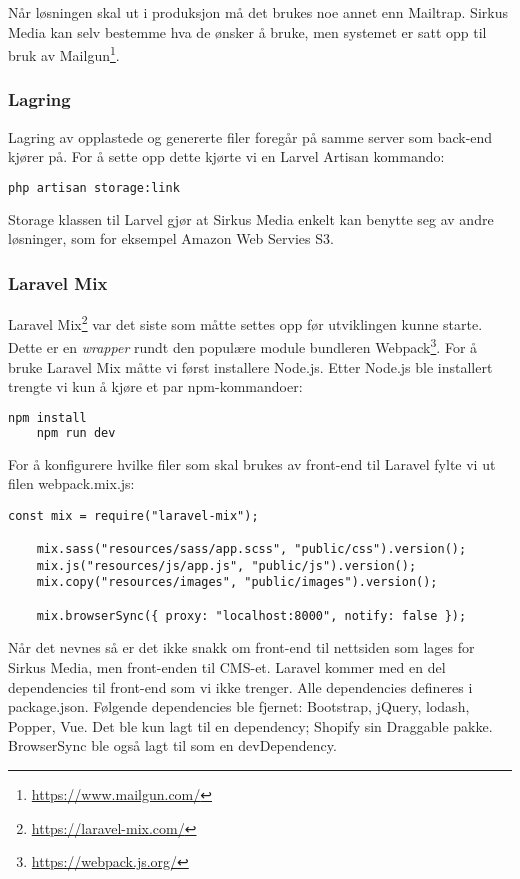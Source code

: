 Når løsningen skal ut i produksjon må det brukes noe annet enn Mailtrap. Sirkus Media kan selv bestemme hva de ønsker å bruke, men systemet er satt opp til bruk av Mailgun\footnote{\url{https://www.mailgun.com/}}.

\subsubsection{Lagring}
Lagring av opplastede og genererte filer foregår på samme server som back-end kjører på. For å sette opp dette kjørte vi en Larvel Artisan kommando:
\begin{lstlisting}[caption={Laravel Artisan kommando for å sette opp lagring av filer}, language=bash]
    php artisan storage:link
\end{lstlisting}
Storage klassen til Larvel gjør at Sirkus Media enkelt kan benytte seg av andre løsninger, som for eksempel Amazon Web Servies S3.

\subsubsection{Laravel Mix}
Laravel Mix\footnote{\url{https://laravel-mix.com/}} var det siste som måtte settes opp før utviklingen kunne starte. Dette er en \textit{wrapper} rundt den populære module bundleren Webpack\footnote{\url{https://webpack.js.org/}}. For å bruke Laravel Mix måtte vi først installere Node.js. Etter Node.js ble installert trengte vi kun å kjøre et par npm-kommandoer:
\begin{lstlisting}[caption={npm-kommando for å sette opp front-end til Laravel}, language=bash]
    npm install
    npm run dev
\end{lstlisting}

For å konfigurere hvilke filer som skal brukes av front-end til Laravel fylte vi ut filen webpack.mix.js:
\begin{lstlisting}[caption={Eksempel på oppsett av webpack.mix.js}]
    const mix = require("laravel-mix");

    mix.sass("resources/sass/app.scss", "public/css").version();
    mix.js("resources/js/app.js", "public/js").version();
    mix.copy("resources/images", "public/images").version();

    mix.browserSync({ proxy: "localhost:8000", notify: false });
\end{lstlisting}

Når det nevnes  så er det ikke snakk om front-end til nettsiden som lages for Sirkus Media, men front-enden til CMS-et.
Laravel kommer med en del dependencies til front-end som vi ikke trenger. Alle dependencies defineres i package.json. Følgende dependencies ble fjernet: Bootstrap, jQuery, lodash, Popper, Vue. Det ble kun lagt til en dependency; Shopify sin Draggable pakke. BrowserSync ble også lagt til som en devDependency.

